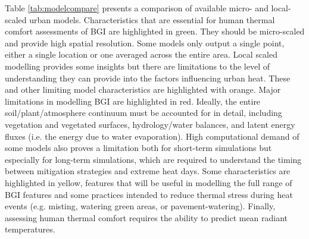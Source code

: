 Table \ref{tab:modelcompare} presents a comparison of available micro- and local-scaled urban models. Characteristics that are essential for human thermal comfort assessments of BGI are highlighted in green. They should be micro-scaled and provide high spatial resolution. Some models only output a single point, either a single location or one averaged across the entire area.  Local scaled modelling provides some insights but there are limitations to the level of understanding they can provide into the factors influencing urban heat. These and other limiting model characteristics are highlighted with orange. Major limitations in modelling BGI are highlighted in red. Ideally, the entire soil/plant/atmosphere continuum must be accounted for in detail, including vegetation and vegetated surfaces, hydrology/water balances, and latent energy fluxes (i.e. the energy due to water evaporation). High computational demand of some models also proves a limitation both for short-term simulations but especially for long-term simulations, which are required to understand the timing between mitigation strategies and extreme heat days. Some characteristics are highlighted in yellow, features that will be useful in modelling the full range of BGI features and some practices intended to reduce thermal stress during heat events (e.g. misting, watering green areas, or pavement-watering). Finally, assessing human thermal comfort requires the ability to predict mean radiant temperatures.


 
  

